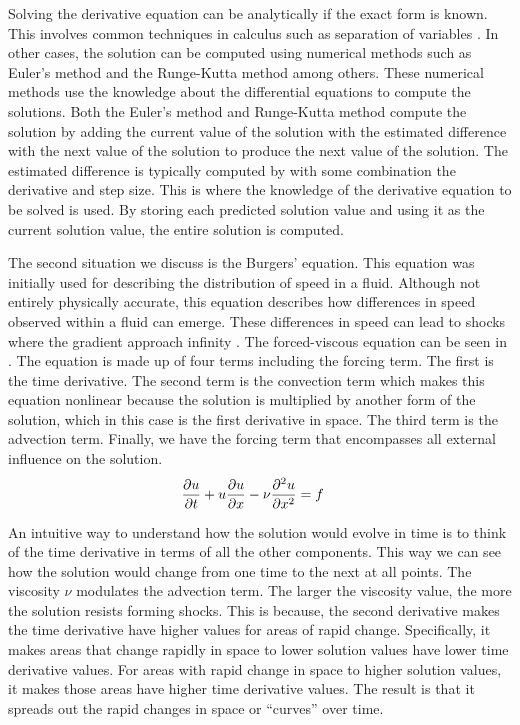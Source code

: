 Solving the derivative equation can be analytically if the exact form is known. This involves common techniques in calculus such as separation of variables \autocite{braunDifferentialEquationsTheir1993}. In other cases, the solution can be computed using numerical methods such as Euler's method and the Runge-Kutta method among others. These numerical methods use the knowledge about the differential equations to compute the solutions. Both the Euler's method and Runge-Kutta method compute the solution by adding the current value of the solution with the estimated difference with the next value of the solution to produce the next value of the solution. The estimated difference is typically computed by with some combination the derivative and step size. This is where the knowledge of the derivative equation to be solved is used. By storing each predicted solution value and using it as the current solution value, the entire solution is computed.

The second situation we discuss is the Burgers' equation. This equation was initially used for describing the distribution of speed in a fluid. Although not entirely physically accurate, this equation describes how differences in speed observed within a fluid can emerge. These differences in speed can lead to shocks where the gradient approach infinity \autocite{orlandiBurgersEquation2000}. The forced-viscous equation can be seen in . The equation is made up of four terms including the forcing term. The first is the time derivative. The second term is the convection term which makes this equation nonlinear because the solution is multiplied by another form of the solution, which in this case is the first derivative in space. The third term is the advection term. Finally, we have the forcing term that encompasses all external influence on the solution.
\begin{align}
  \pdv{u}{t}+u\pdv{u}{x}-\nu\pdv[2]{u}{x} & = f \label{eq:forced_viscous_burgers}
\end{align}

An intuitive way to understand how the solution would evolve in time is to think of the time derivative in terms of all the other components. This way we can see how the solution would change from one time to the next at all points. The viscosity \(\nu \) modulates the advection term. The larger the viscosity value, the more the solution resists forming shocks. This is because, the second derivative makes the time derivative have higher values for areas of rapid change. Specifically, it makes areas that change rapidly in space to lower solution values have lower time derivative values. For areas with rapid change in space to higher solution values, it makes those areas have higher time derivative values. The result is that it spreads out the rapid changes in space or \enquote{curves} over time.

